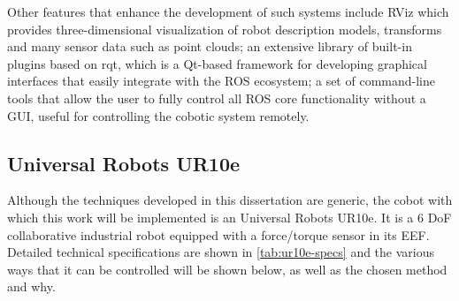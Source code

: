 \par Other features that enhance the development of such systems include RViz which provides three-dimensional visualization of robot description models, transforms and many sensor data such as point clouds; an extensive library of built-in plugins based on rqt, which is a Qt-based framework for developing graphical interfaces that easily integrate with the ROS ecosystem; a set of command-line tools that allow the user to fully control all ROS core functionality without a GUI, useful for controlling the cobotic system remotely.

\subsection{Universal Robots UR10e}

\par Although the techniques developed in this dissertation are generic, the cobot with which this work will be implemented is an Universal Robots UR10e. It is a 6 DoF collaborative industrial robot equipped with a force/torque sensor in its EEF. Detailed technical specifications are shown in \autoref{tab:ur10e-specs} and the various ways that it can be controlled will be shown below, as well as the chosen method and why.

